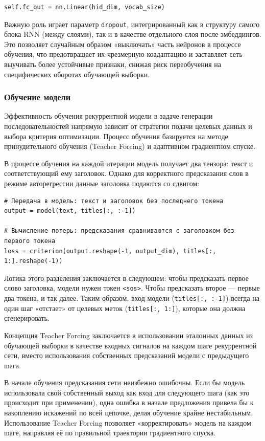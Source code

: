 \documentclass[coursework]{SCWorks}
\begin{document}
    \begin{verbatim}
self.fc_out = nn.Linear(hid_dim, vocab_size)
    \end{verbatim}

    Важную роль играет параметр \texttt{dropout}, интегрированный как в структуру самого блока RNN (между слоями), так и в качестве отдельного слоя после эмбеддингов. Это позволяет случайным образом «выключать» часть нейронов в процессе обучения, что предотвращает их чрезмерную коадаптацию и заставляет сеть выучивать более устойчивые признаки, снижая риск переобучения на специфических оборотах обучающей выборки.

    \subsubsection{Обучение модели}

    Эффективность обучения рекуррентной модели в задаче генерации последовательностей напрямую зависит от стратегии подачи целевых данных и выбора критерия оптимизации. Процесс обучения базируется на методе принудительного обучения (Teacher Forcing) и адаптивном градиентном спуске.

    В процессе обучения на каждой итерации модель получает два тензора: текст и соответствующий ему заголовок. Однако для корректного предсказания слов в режиме авторегрессии данные заголовка подаются со сдвигом:

    \begin{verbatim}
# Передача в модель: текст и заголовок без последнего токена
output = model(text, titles[:, :-1])

# Вычисление потерь: предсказания сравниваются с заголовком без первого токена
loss = criterion(output.reshape(-1, output_dim), titles[:, 1:].reshape(-1))
    \end{verbatim}

    Логика этого разделения заключается в следующем: чтобы предсказать первое слово заголовка, модели нужен токен \texttt{<sos>}. Чтобы предсказать второе — первые два токена, и так далее. Таким образом, вход модели (\texttt{titles[:, :-1]}) всегда на один шаг «отстает» от целевых меток (\texttt{titles[:, 1:]}), которые она должна сгенерировать.

    Концепция Teacher Forcing заключается в использовании эталонных данных из обучающей выборки в качестве входных сигналов на каждом шаге рекуррентной сети, вместо использования собственных предсказаний модели с предыдущего шага.

    В начале обучения предсказания сети неизбежно ошибочны. Если бы модель использовала свой собственный выход как вход для следующего шага (как это происходит при применении), одна ошибка в начале предложения привела бы к накоплению искажений по всей цепочке, делая обучение крайне нестабильным. Использование Teacher Forcing позволяет «корректировать» модель на каждом шаге, направляя её по правильной траектории градиентного спуска.
\end{document}
